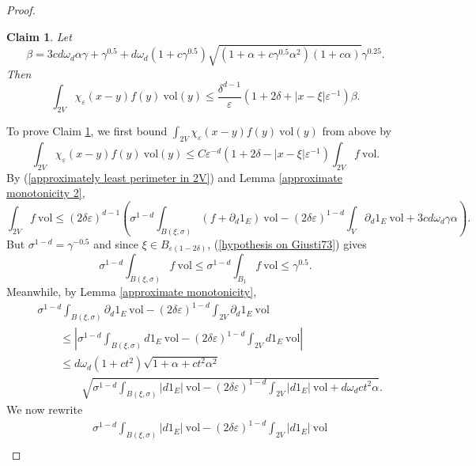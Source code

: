 \documentclass[reqno,12pt,letterpaper]{amsart}
\newcommand{\vol}{\mathrm{vol}}
\newtheorem{claim}[theorem]{Claim}
\theoremstyle{definition}
\numberwithin{equation}{section}
\begin{document}
\begin{proof}
\begin{claim}\label{BMC2}
Let
\begin{equation}\label{definition of beta}
\beta = 3cd\omega_d\alpha\gamma + \gamma^{0.5} + d\omega_d(1 + c\gamma^{0.5})\sqrt{(1 + \alpha + c\gamma^{0.5}\alpha^2)(1 + c\alpha)}\gamma^{0.25}.
\end{equation}
Then
\begin{equation}\label{kernel eliminated}
\int_{2V} \chi_\varepsilon(x - y)f(y) ~\vol(y) \leq \frac{\delta^{d - 1}}{\varepsilon}(1 + 2\delta + |x - \xi|\varepsilon^{-1})\beta.
\end{equation}
\end{claim}
To prove Claim \ref{BMC2}, we first bound $\int_{2V} \chi_\varepsilon(x - y)f(y) ~\vol(y)$ from above by
\begin{equation}\label{eliminate the kernel}
\int_{2V} \chi_\varepsilon(x - y)f(y) ~\vol(y) \leq C\varepsilon^{-d}(1 + 2\delta - |x - \xi|\varepsilon^{-1}) \int_{2V} f ~\vol.
\end{equation}
By (\ref{approximately least perimeter in 2V}) and Lemma \ref{approximate monotonicity 2},
$$\int_{2V} f~\vol \leq (2\delta\varepsilon)^{d - 1} \left(\sigma^{1 - d} \int_{B(\xi, \sigma)} (f + \partial_d1_E) ~\vol - (2\delta\varepsilon)^{1 - d} \int_V \partial_d1_E ~\vol + 3cd\omega_d\gamma\alpha\right).$$
But $\sigma^{1 - d} = \gamma^{-0.5}$ and since $\xi \in B_{\varepsilon(1 - 2\delta)}$, (\ref{hypothesis on Giusti73}) gives
\begin{equation}\label{we get sqrt gamma}
\sigma^{1 - d} \int_{B(\xi, \sigma)} f ~\vol \leq \sigma^{1 - d} \int_{B_1} f ~\vol \leq \gamma^{0.5}.
\end{equation}
Meanwhile, by Lemma \ref{approximate monotonicity},
\begin{align*}
&\sigma^{1 - d} \int_{B(\xi, \sigma)} \partial_d1_E ~\vol - (2\delta\varepsilon)^{1 - d} \int_{2V} \partial_d1_E ~\vol\\
& \qquad \leq \left|\sigma^{1 - d} \int_{B(\xi, \sigma)} d1_E ~\vol - (2\delta\varepsilon)^{1 - d} \int_{2V} d1_E ~\vol\right|\\
& \qquad \leq d\omega_d (1 + ct^2)\sqrt{1 + \alpha + ct^2 \alpha^2} \\
&\qquad \qquad \sqrt{\sigma^{1 - d} \int_{B(\xi, \sigma)} |d1_E| ~\vol - (2\delta\varepsilon)^{1 - d} \int_{2V} |d1_E| ~\vol + d\omega_dct^2\alpha}.
\end{align*}
We now rewrite
\begin{align*}
&\sigma^{1 - d} \int_{B(\xi, \sigma)} |d1_E| ~\vol - (2\delta\varepsilon)^{1 - d} \int_{2V} |d1_E| ~\vol\\

\end{align*}
\end{proof}
\end{document}
